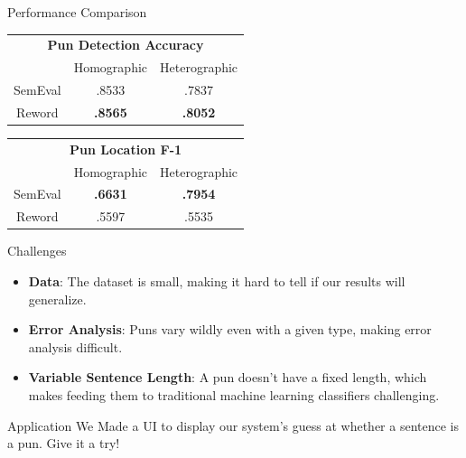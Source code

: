 \documentclass[final]{beamer}
\newlength{\onecolwid}
\begin{document}
\begin{frame}[t]
\begin{columns}[t]
\begin{column}{\onecolwid}
\begin{block}{Performance Comparison}
				\begin{center}
					\begin{tabular}{ c|c|c } 
						\multicolumn{3}{c}{\textbf{Pun Detection Accuracy}}\\
						 & Homographic & Heterographic \\ 
						\hline
						SemEval & .8533 & .7837 \\ 
						\hline
						Reword & \textbf{.8565} & \textbf{.8052} \\ 
					\end{tabular}
				\end{center}
				\vspace{10mm}
				\begin{center}
					\begin{tabular}{ c|c|c } 
						\multicolumn{3}{c}{\textbf{Pun Location F-1}}\\
						 & Homographic & Heterographic \\ 
						\hline
						SemEval & \textbf{.6631} & \textbf{.7954} \\ 
						\hline
						Reword & .5597 & .5535 \\ 
					\end{tabular}
				\end{center}
            \end{block}
            \vspace{20mm}
            \begin{block}{Challenges}
				\large{
					\begin{itemize}
						\item {\textbf{Data}:
							The dataset is small, making it hard to tell if our results will generalize.
						}
						\item {\textbf{Error Analysis}:
							Puns vary wildly even with a given type, making error analysis difficult.
						}
						\item {\textbf{Variable Sentence Length}:
							A pun doesn't have a fixed length, which makes feeding them to traditional machine learning classifiers challenging.
						}
					\end{itemize}
				}
            \end{block}
            \vspace{20mm}
			\begin{block}{Application}
				\large{
					We Made a UI to display our system's guess at whether a sentence is a pun. Give it a try!
				}
				\vspace{20mm}


\end{block}
\end{column}
\end{columns}
\end{frame}
\end{document}

